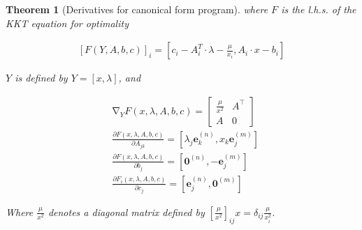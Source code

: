 \documentclass[12pt]{article}
\DeclareMathOperator{\grad}{\mathop{\nabla}}
\newcommand{\dotprod}[2]{#1\mathbin{\cdot}#2}
\newcommand{\pa}[1]{\left( #1 \right)}
\newcommand{\br}[1]{\left[ #1 \right]}
\newtheorem{theorem}{Theorem}
\begin{document}
\begin{theorem}[Derivatives for canonical form program]
where $F$ is the l.h.s. of the KKT equation for optimality

\begin{align}
    \label{eq::LHS_KKT_can_LP}
    [F(Y, A, b, c)]_i = \br{c_i - \dotprod{A^T_i}{\lambda} - \frac{\mu}{x_i}
    , \dotprod{A_i}{x} - b_i}
\end{align}

$Y$ is defined by $Y = [x, \lambda]$, and 

\newcommand{\uvec}[2]{\mathbf{e}_{#1}^{\pa{#2}}}
\newcommand{\zerovec}[1]{\mathbf{0}^{\pa{#1}}}
\newcommand{\onevec}[1]{\mathbf{1}^{\pa{#1}}}

\begin{subequations}
    \label{eq::der_can_LP}
    \begin{align}
    \label{eq::der_Y_can_LP}
    & \grad_Y F(x, \lambda, A, b, c) =
    \begin{bmatrix}
    \frac{\mu}{x^2} & A^\top \\
    A & 0
    \end{bmatrix} \\
    \label{eq::der_A_can_LP}
    &\frac{\partial F(x, \lambda, A, b, c)}{\partial A_{jk}} = \br{\lambda_j\uvec{k}{n}, x_k\uvec{j}{m}} \\
    \label{eq::der_b_can_LP}
    &\frac{\partial F(x, \lambda, A, b, c)}{\partial b_{j}} = \br{\zerovec{n}, -\uvec{j}{m}} \\
    \label{eq::der_c_can_LP}
    & \frac{\partial F_i(x, \lambda, A, b, c)}{\partial c_{j}}
    = \br{\uvec{j}{n}, \zerovec{m}}
    \end{align}
\end{subequations}

Where $\frac{\mu}{x^2}$ denotes a diagonal matrix defined by 
$\br{\frac{\mu}{x^2}}_{ij}x =\delta_{ij}\frac{\mu}{x_i^2}$.

\end{theorem}
\end{document}
